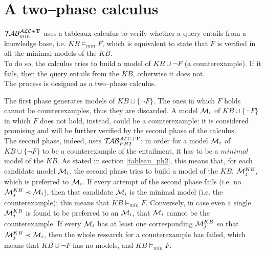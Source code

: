 \documentclass[a4paper, 11pt, oneside]{duthesis}
\newcommand{\tip}{{\bf T}}
\newcommand{\unione} {\cup}
\newcommand{\nott} {\lnot}
\newcommand{\emme} {\begin{mathcal}M\end{mathcal}}
\newcommand{\nuovoc}{\mathrel{{\mathcal{T}\!\mathcal{AB}}}_{min}^{\mathcal{ALC}+\mbox{\scriptsize $\tip$}}}
\newcommand{\secondo}{\mathrel{{\mathcal{T}\!\mathcal{AB}}}_{PH 2}^{\mathcal{ALC}+\mbox{\scriptsize $\tip$}}}
\begin{document}
\section{A two--phase calculus}\label{calc_2ph}

$\nuovoc$ uses a tableaux calculus to verify whether a query entails from a knowledge base, i.e. $KB \models_{min} F$, which is equivalent to state that $F$ is verified in all the minimal models of the $KB$.\\
To do so, the calculus tries to build a model of $KB \unione \neg F$ (a counterexample). If it fails, then the query entails from the $KB$, otherwise it does not.\\

The process is designed as a two--phase calculus.

The first phase generates models of $KB \unione \{\nott F\}$. The ones in which $F$ holds cannot be counterexamples, thus they are discarded. A model $\emme_i$ of $KB \unione \{\nott F\}$ in which $F$ does not hold, instead, could be a counterexample: it is considered promising and will be further verified by the second phase of the calculus.\\
The second phase, indeed, uses $\secondo$: in order for a model $\emme_i$ of $KB \unione \{\nott F\}$ to be a counterexample of the entailment, it has to be a $minimal$ model of the $KB$. As stated in section \ref{tableau_ph2}, this means that, for each candidate model $\emme_i$, the second phase tries to build a model of the $KB$, $\emme_j^{KB}$, which is preferred to $\emme_i$. If every attempt of the second phase fails (i.e. no $\emme_j^{KB} \prec \emme_i$), then that candidate $\emme_i$ is the minimal model (i.e. the counterexample): this means that $KB \models_{min} F$.
Conversely, in case even a single $\emme_j^{KB}$ is found to be preferred to an $\emme_i$, that $\emme_i$ cannot be the counterexample.
If every $\emme_i$ has at least one corresponding $\emme_j^{KB}$ so that $\emme_j^{KB} \prec \emme_i$, then the whole research for a counterexample has failed, which means that $KB \unione \neg F$ has no models, and $KB \models_{min} F$.\\

\end{document}
